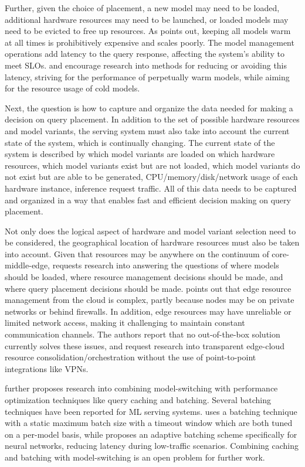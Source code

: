Further, given the choice of placement, a new model may need to be loaded, additional hardware resources may need to be launched, or loaded models may need to be evicted to free up resources.
As \cite{Zhang2020} points out, keeping all models warm at all times is prohibitively expensive and scales poorly.
The model management operations add latency to the query response, affecting the system's ability to meet SLOs.
\cite{Yadwadkar2019} and \cite{Zhang2020} encourage research into methods for reducing or avoiding this latency, striving for the performance of perpetually warm models, while aiming for the resource usage of cold models.

Next, the question is how to capture and organize the data needed for making a decision on query placement.
In addition to the set of possible hardware resources and model variants, the serving system must also take into account the current state of the system, which is continually changing.
The current state of the system is described by which model variants are loaded on which hardware resources, which model variants exist but are not loaded, which model variants do not exist but are able to be generated, CPU/memory/disk/network usage of each hardware instance, inference request traffic.
All of this data needs to be captured and organized in a way that enables fast and efficient decision making on query placement.

Not only does the logical aspect of hardware and model variant selection need to be considered, the geographical location of hardware resources must also be taken into account.
Given that resources may be anywhere on the continuum of core-middle-edge, \cite{Yadwadkar2019} requests research into answering the questions of where models should be loaded, where resource management decisions should be made, and where query placement decisions should be made.
\cite{Rausch2019a} points out that edge resource management from the cloud is complex, partly because nodes may be on private networks or behind firewalls.
In addition, edge resources may have unreliable or limited network access, making it challenging to maintain constant communication channels.
The authors report that no out-of-the-box solution currently solves these issues, and request research into transparent edge-cloud resource consolidation/orchestration without the use of point-to-point integrations like VPNs.

\cite{Zhang2020} further proposes research into combining model-switching with performance optimization techniques like query caching and batching.
Several batching techniques have been reported for ML serving systems.
\cite{Crankshaw2017} uses a batching technique with a static maximum batch size with a timeout window which are both tuned on a per-model basis, while \cite{Choi2021} proposes an adaptive batching scheme specifically for neural networks, reducing latency during low-traffic scenarios.
Combining caching and batching with model-switching is an open problem for further work.


